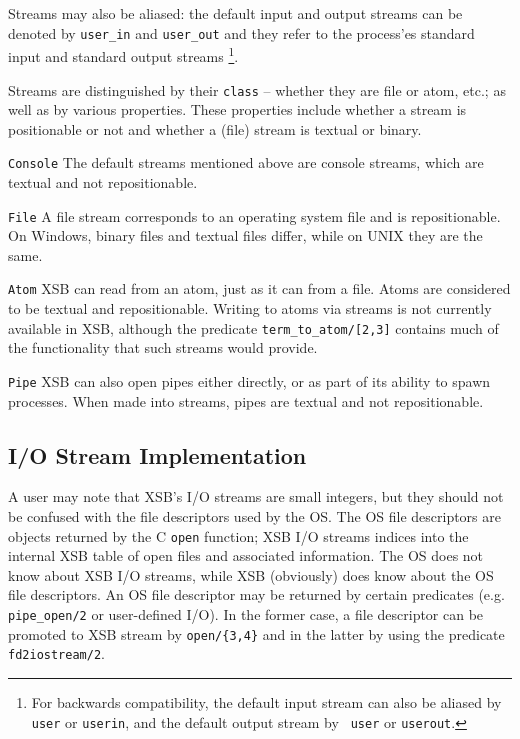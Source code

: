 Streams may also be aliased: the default input and output streams can
be denoted by {\tt user\_in} and {\tt user\_out} and they refer to the
process'es standard input and standard output streams \footnote{For
backwards compatibility, the default input stream can also be aliased
by {\tt user} or {\tt userin}, and the default output stream by {\tt
user} or {\tt userout}.}.

Streams are distinguished by their {\tt class} -- whether they are
file or atom, etc.; as well as by various properties.  These
properties include whether a stream is positionable or not and whether
a (file) stream is textual or binary.

\bi
\item {\tt Console} The default streams mentioned above are
console streams, which are textual and not repositionable.
%
\item {\tt File}  A file stream corresponds to an operating system
file and is repositionable.  On Windows, binary files and textual
files differ, while on UNIX they are the same.  
%
\item {\tt Atom} XSB can read from an atom, just as it can from a file.
Atoms are considered to be textual and repositionable.  Writing to
atoms via streams is not currently available in XSB, although 
the predicate {\tt term\_to\_atom/[2,3]} contains much of the
functionality that such streams would provide.

\item {\tt Pipe} XSB can also open pipes either directly, or as part
of its ability to spawn processes.  When made into streams, pipes are
textual and not repositionable.
\ei

\subsection{I/O Stream Implementation}

A user may note that XSB's I/O streams are small integers, but they
should not be confused with the file descriptors used by the OS.  The
OS file descriptors are objects returned by the C {\tt open} function;
XSB I/O streams indices into the internal XSB table of open files and
associated information. The OS does not know about XSB I/O streams,
while XSB (obviously) does know about the OS file descriptors. An OS
file descriptor may be returned by certain predicates (e.g.  {\tt
pipe\_open/2} or user-defined I/O).  In the former case, a file
descriptor can be promoted to XSB stream by {\tt open/\{3,4\}} and in
the latter by using the predicate {\tt fd2iostream/2}.

